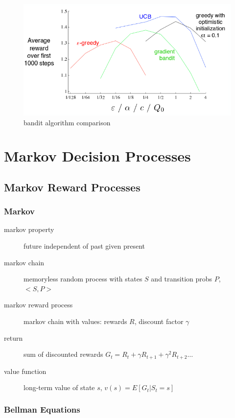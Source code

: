 \documentclass[]{article}
\theoremstyle{definition}
\begin{document}
\begin{figure}[ht]
    \centering
    \includegraphics[width=0.7\linewidth]{bandit_comparison.png}
    \caption{bandit algorithm comparison}
    \label{fig:bandit-comparison}
\end{figure}

\section{Markov Decision Processes}
\label{sec:markov_decision_processes}

\subsection{Markov Reward Processes}
\label{sub:markov}

\subsubsection{Markov}
\label{ssub:markov}


\begin{description}
    \item[markov property] future independent of past given present
    \item[markov chain] memoryless random process with states $S$ and transition probs $P$, $<S,P>$

    \item[markov reward process] markov chain with values: rewards $R$, discount factor $\gamma$
    \item[return] sum of discounted rewards $G_t = R_t + \gamma R_{t+1} + \gamma^2 R_{t+2} \ldots$
    \item[value function] long-term value of state $s$, $v(s) = E[G_t | S_t = s]$
\end{description}

\subsubsection{Bellman Equations}
\label{ssub:mrp_bellman_equations}
\end{document}
